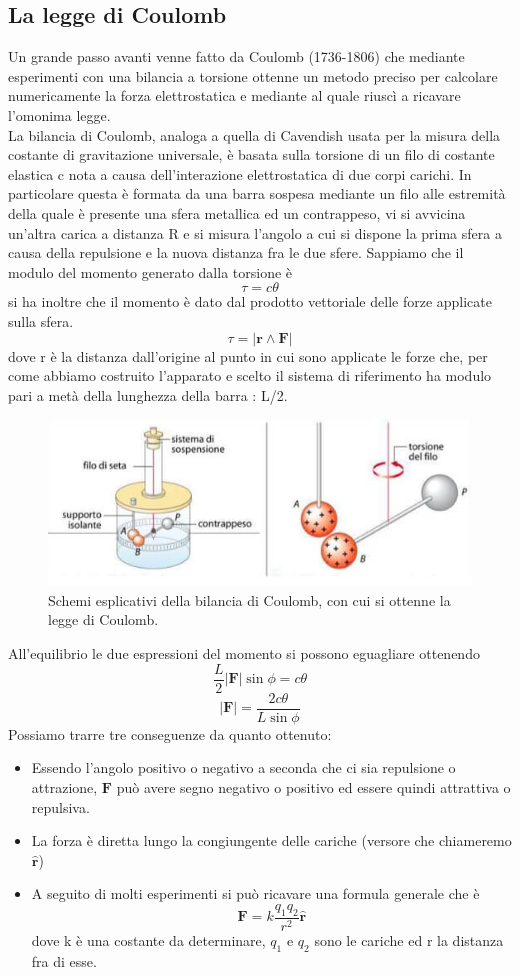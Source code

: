 \documentclass[
10pt, %
a4paper, %
oneside, %
headinclude,footinclude, %
BCOR5mm, %
]{scrartcl}
\begin{document}
\subsection{La legge di Coulomb}
Un grande passo avanti venne fatto da Coulomb (1736-1806) che mediante esperimenti con una bilancia a torsione ottenne un metodo preciso per calcolare numericamente la forza elettrostatica e mediante al quale riuscì a ricavare l'omonima legge.\\
La bilancia di Coulomb, analoga a quella di Cavendish usata per la misura della costante di gravitazione universale, è basata sulla torsione di un filo di costante elastica c nota a causa dell'interazione elettrostatica di due corpi carichi. In particolare questa è formata da una barra sospesa mediante un filo alle estremità della quale è presente una sfera metallica ed un contrappeso, vi si avvicina un'altra carica a distanza R e si misura l'angolo a cui si dispone la prima sfera a causa della repulsione e la nuova distanza fra le due sfere. Sappiamo che il modulo del momento generato dalla torsione è
\[\tau = c\theta\]
si ha inoltre che il momento è dato dal prodotto vettoriale delle forze applicate sulla sfera.
\[\tau = |\mathbf{r}\wedge \mathbf{F}|\]
dove r è la distanza dall'origine al punto in cui sono applicate le forze che, per come abbiamo costruito l'apparato e scelto il sistema di riferimento ha modulo pari a metà della lunghezza della barra : L/2. 
\begin{figure}[h!]
	\centering
	\includegraphics[width=0.6\linewidth]{../images/bilancia_coulomb}
	\caption{Schemi esplicativi della bilancia di Coulomb, con cui si ottenne la legge di Coulomb.}
	\label{fig:bilanciacoulomb}
\end{figure}
\FloatBarrier
All'equilibrio le due espressioni del momento si possono eguagliare ottenendo 
\[\frac{L}{2}|\mathbf{F}|\sin\phi = c\theta\]
\[|\mathbf{F}| = \frac{2c\theta}{L\sin\phi}\] 
Possiamo trarre tre conseguenze da quanto ottenuto:
\begin{itemize}
	\item Essendo l'angolo positivo o negativo a seconda che ci sia repulsione o attrazione, $\mathbf{F}$ può avere segno negativo o positivo ed essere quindi attrattiva o repulsiva. 
	\item La forza è diretta lungo la congiungente delle cariche (versore che chiameremo $\hat{\mathbf{r}}$)
	\item A seguito di molti esperimenti si può ricavare una formula generale che è 
	\[\mathbf{F} = k \frac{q_1q_2}{r^2}\hat{\mathbf{r}}\]
	dove k è una costante da determinare, \(q_1\) e \(q_2\) sono le cariche ed r la distanza fra di esse. 
\end{itemize}
\end{document}
